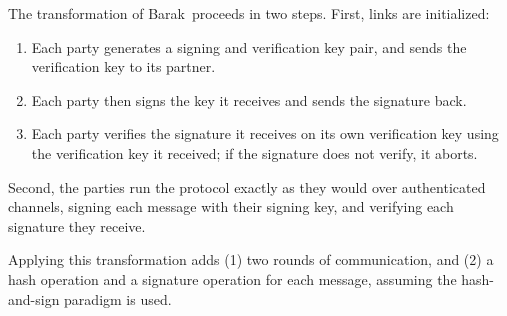 The transformation of Barak~\etal proceeds in two steps.
First, links are initialized:
\begin{enumerate}
\item
Each party generates a signing and verification key pair, and sends the verification key to its partner. 
\item 
Each party then signs the key it receives and sends the signature back.
\item
Each party verifies the signature it receives on its own verification key using the verification key it received; if the signature does not verify, it aborts.
\end{enumerate}
Second, the parties run the protocol exactly as they would over authenticated channels, signing each message with their signing key, and verifying each signature they receive.

Applying this transformation adds (1) two rounds of communication, and (2) a hash operation and a signature operation for each message, assuming the hash-and-sign paradigm is used.

